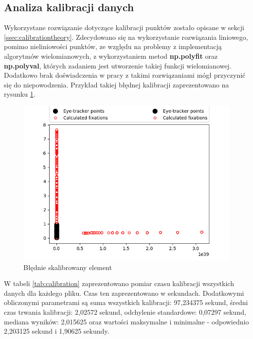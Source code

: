 \subsection{Analiza kalibracji danych}
\label{ssec:calibration}
Wykorzystane rozwiązanie dotyczące kalibracji punktów zostało opisane w sekcji \ref{ssec:calibrationtheory}. Zdecydowano się na wykorzystanie rozwiązania liniowego, pomimo nieliniowości punktów, ze względu na problemy z implementacją algorytmów wielomianowych, z wykorzystaniem metod \textbf{np.polyfit} oraz \textbf{np.polyval}, których zadaniem jest utworzenie takiej funkcji wielomianowej. Dodatkowo brak doświadczenia w pracy z takimi rozwiązaniami mógł przyczynić się do niepowodzenia. Przykład takiej błędnej kalibracji zaprezentowano na rysunku \ref{fig:error_cal}.
\begin{figure}[H]
    \centering
    \captionsetup{justification=centering,margin=2cm}
    \includegraphics[width=\linewidth]{resources/error_cal.png}
    \caption{Błędnie skalibrowany element}
    \label{fig:error_cal}
\end{figure}
W tabeli \ref{tab:calibration} zaprezentowano pomiar czasu kalibracji wszystkich danych dla każdego pliku. Czas ten zaprezentowano w sekundach. Dodatkowymi obliczonymi parametrami są suma wszystkich kalibracji: 97,234375 sekund, średni czas trwania kalibracji:	2,02572 sekund, odchylenie standardowe: 0,07297 sekund, mediana wyników: 2,015625 oraz wartości maksymalne i minimalne - odpowiednio 2,203125 sekund i 1,90625 sekundy.
